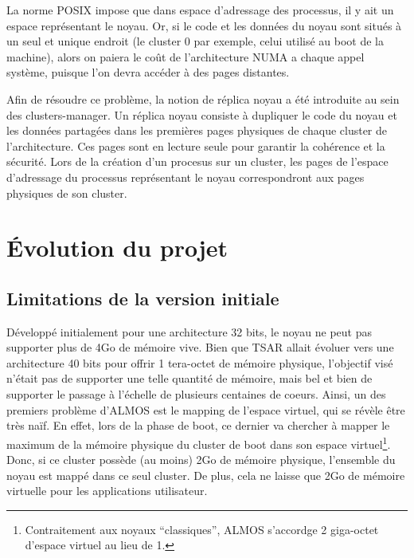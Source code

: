       La norme POSIX impose que dans espace d'adressage des processus, il y ait
      un espace représentant le noyau. Or, si le code et les données du noyau
      sont situés à un seul et unique endroit (le cluster 0 par exemple, celui
      utilisé au boot de la machine), alors on paiera le coût de l'architecture
      NUMA a chaque appel système, puisque l'on devra accéder à des pages
      distantes.

      Afin de résoudre ce problème, la notion de réplica noyau a été introduite
      au sein des clusters-manager. Un réplica noyau consiste à dupliquer le
      code du noyau et les données partagées dans les premières pages physiques
      de chaque cluster de l'architecture. Ces pages sont en lecture seule pour
      garantir la cohérence et la sécurité. Lors de la création d'un procesus
      sur un cluster, les pages de l'espace d'adressage du processus
      représentant le noyau correspondront aux pages physiques de son cluster.


  \section{}



  \section{Évolution du projet}

    \subsection{Limitations de la version initiale}
    \label{subsec:unsolved}
    
      Développé initialement pour une architecture 32 bits, le noyau ne peut pas
      supporter plus de 4Go de mémoire vive. Bien que TSAR allait évoluer vers
      une architecture 40 bits pour offrir 1 tera-octet de mémoire physique,
      l'objectif visé n'était pas de supporter une telle quantité de mémoire,
      mais bel et bien de supporter le passage à l'échelle de plusieurs
      centaines de coeurs. Ainsi, un des premiers problème d'ALMOS est le
      mapping de l'espace virtuel, qui se révèle être très naïf. En effet, lors
      de la phase de boot, ce dernier va chercher à mapper le maximum de la
      mémoire physique du cluster de boot dans son espace
      virtuel\footnote{Contraitement aux noyaux ``classiques'', ALMOS s'accordge
        2 giga-octet d'espace virtuel au lieu de 1.}. Donc, si ce cluster
      possède (au moins) 2Go de mémoire physique, l'ensemble du noyau est mappé
      dans ce seul cluster. De plus, cela ne laisse que 2Go de mémoire virtuelle
      pour les applications utilisateur. 

